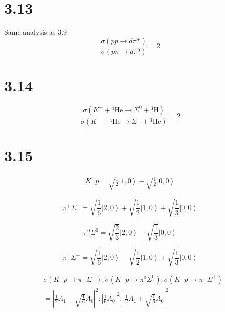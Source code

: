 \documentclass{article}
\begin{document}
\begin{CJK*}{GBK}{song}
\section{3.13}
Same analysis as 3.9
\begin{equation}
\frac{\sigma(pp\rightarrow d\pi^+)}{\sigma(pn\rightarrow d\pi^0)}=2
\end{equation}

\section{3.14}
\begin{equation}
\frac{\sigma(K^-+{}^4\text{He}\rightarrow\Sigma^0+{}^3\text{H})}{\sigma(K^-+{}^4\text{He}\rightarrow\Sigma^-+{}^3\text{He})}=2
\end{equation}


\section{3.15}
\begin{equation}
\begin{aligned}
K^-p=\sqrt{\frac{1}{2}}\left|1,0\right\rangle-\sqrt{\frac{1}{2}}\left|0,0\right\rangle
\end{aligned}
\end{equation}



\begin{equation}
\pi^+\Sigma^-=\sqrt{\frac{1}{6}}\left|2,0\right\rangle+\sqrt{\frac{1}{2}}\left|1,0\right\rangle+\sqrt{\frac{1}{3}}\left|0,0\right\rangle
\end{equation}

\begin{equation}
\pi^0\Sigma^0=\sqrt{\frac{2}{3}}\left|2,0\right\rangle-\sqrt{\frac{1}{3}}\left|0,0\right\rangle
\end{equation}

\begin{equation}
\pi^-\Sigma^+=\sqrt{\frac{1}{6}}\left|2,0\right\rangle-\sqrt{\frac{1}{2}}\left|1,0\right\rangle+\sqrt{\frac{1}{3}}\left|0,0\right\rangle
\end{equation}

\begin{equation}
\begin{aligned}
&\sigma(K^-p\rightarrow\pi^+\Sigma^-):\sigma(K^-p\rightarrow\pi^0\Sigma^0):\sigma(K^-p\rightarrow\pi^-\Sigma^+)\\
&=\left|\frac{1}{2}A_{1}-\sqrt{\frac{1}{6}}A_{0}\right|^2:\left|\frac{1}{6}A_{0}\right|^2:\left|\frac{1}{2}A_{1}+\sqrt{\frac{1}{6}}A_{0}\right|^2
\end{aligned}
\end{equation}


\end{CJK*}
\end{document}
